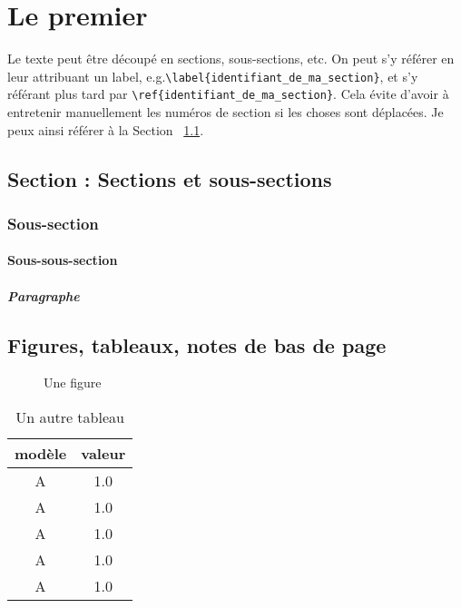\chapter{Le premier}
\label{chapitre:un}

Le texte peut être découpé en sections, sous-sections, etc. On peut s'y référer en leur attribuant un label, e.g.\verb|\label{identifiant_de_ma_section}|, et s'y référant plus tard par \verb|\ref{identifiant_de_ma_section}|.
Cela évite d'avoir à entretenir manuellement les numéros de section si les choses sont déplacées.
Je peux ainsi référer à la Section ~\ref{sec:secetss}.

\section{Section : Sections et sous-sections}
\label{sec:secetss}
\lipsum[2]

\subsection{Sous-section}
\label{sec:masoussec}
\lipsum[3]
\subsubsection{Sous-sous-section}
\label{sec:massoussoussec}

\lipsum[1-2]

\paragraph{Paragraphe}
\label{sec:unparagraphe}
\lipsum[3-4]

\section{Figures, tableaux, notes de bas de page}

\begin{figure}
    \centering
    
    \caption{Une figure}
    \label{fig:figure1}
\end{figure}

\begin{table}
    \centering
    \begin{tabular}{cc}
        \hline
        modèle & valeur \\
        \hline
         A & 1.0 \\
         A & 1.0 \\
         A & 1.0 \\
         A & 1.0 \\
         A & 1.0 \\
        \hline
    \end{tabular}
    \caption{Un autre tableau}
    \label{tab:tableau2}
\end{table}

